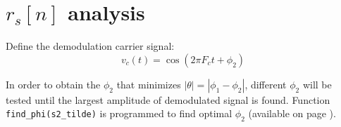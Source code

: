 \documentclass{article}
\newenvironment{homeworkProblem}[1]{
	\section{#1}
	}{
}
\begin{document}
\begin{homeworkProblem}{$r_s[n]$ analysis}
Define the demodulation carrier signal:
\begin{equation}\label{demodulation_carrier}
v_c(t) = \cos(2 \pi F_c t + \phi_2)
\end{equation}

In order to obtain the $\phi_2$ that minimizes $|\theta| = |\phi_1 - \phi_2|$, different $\phi_2$ will be tested until the largest amplitude of demodulated signal is found. Function \texttt{find\_phi(s2\_tilde)} is programmed to find optimal $\phi_2$ (available on page \pageref{find_phi}).


\end{homeworkProblem}

\end{document}
